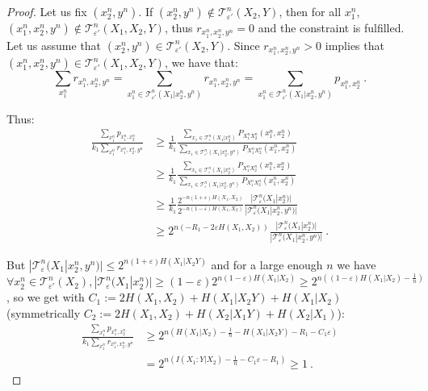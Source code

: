 \begin{proof}
    Let us fix $(x_2^n,y^n)$. If $(x_2^n,y^n) \not\in \mathcal{T}^n_{\varepsilon'}(X_2,Y)$, then for all $x_1^n$, $(x_1^n,x_2^n,y^n) \not\in \mathcal{T}^n_{\varepsilon'}(X_1,X_2,Y)$, thus $r_{x_1^n,x_2^n,y^n} = 0$ and the constraint is fulfilled. Let us assume that $(x_2^n,y^n) \in \mathcal{T}^n_{\varepsilon'}(X_2,Y)$. Since $r_{x_1^n,x_2^n,y^n} > 0$ implies that $(x_1^n,x_2^n,y^n) \in \mathcal{T}^n_{\varepsilon'}(X_1,X_2,Y)$, we have that:
    \[ \sum_{x_1^n} r_{x_1^n,x_2^n,y^n} = \sum_{x_1^n \in \mathcal{T}^n_{\varepsilon'}(X_1|x_2^n,y^n)} r_{x_1^n,x_2^n,y^n} = \sum_{x_1^n \in \mathcal{T}^n_{\varepsilon'}(X_1|x_2^n,y^n)} p_{x_1^n,x_2^n} \ .\]
    
    Thus:
     \begin{equation}
      \begin{aligned}
        \frac{\sum_{x_1^n} p_{x_1^n,x_2^n}}{k_1\sum_{x_1^n} r_{x_1^n,x_2^n,y^n}} &\geq \frac{1}{k_1} \frac{ \sum_{x_1 \in \mathcal{T}^n_{\varepsilon}(X_1|x_2^n)}P_{X_1^nX_2^n}(x_1^n,x_2^n)}{\sum_{x_1 \in \mathcal{T}^n_{\varepsilon'}(X_1|x_2^n,y^n)} P_{X_1^nX_2^n}(x_1^n,x_2^n)}\\
        &\geq \frac{1}{k_1} \frac{ \sum_{x_1 \in \mathcal{T}^n_{\varepsilon}(X_1|x_2^n)}P_{X_1^nX_2^n}(x_1^n,x_2^n)}{\sum_{x_1 \in \mathcal{T}^n_{\varepsilon}(X_1|x_2^n,y^n)} P_{X_1^nX_2^n}(x_1^n,x_2^n)}\\
        &\geq \frac{1}{k_1}\frac{2^{-n(1+\varepsilon)H(X_1,X_2)}}{2^{-n(1-\varepsilon)H(X_1,X_2)}}\frac{|\mathcal{T}^n_{\varepsilon}(X_1|x_2^n)|}{|\mathcal{T}^n_{\varepsilon}(X_1|x_2^n,y^n)|}\\
        &\geq 2^{n(-R_1-2\varepsilon H(X_1,X_2))}\frac{|\mathcal{T}^n_{\varepsilon}(X_1|x_2^n)|}{|\mathcal{T}^n_{\varepsilon}(X_1|x_2^n,y^n)|}\ .
      \end{aligned}
    \end{equation}

     But $|\mathcal{T}^n_{\varepsilon}(X_1|x_2^n,y^n)| \leq 2^{n(1+\varepsilon)H(X_1|X_2Y)}$ and for a large enough $n$ we have $\forall x_2^n \in \mathcal{T}^n_{\varepsilon'}(X_2), |\mathcal{T}^n_{\varepsilon}(X_1|x_2^n)| \geq (1-\varepsilon)2^{n(1-\varepsilon)H(X_1|X_2)} \geq 2^{n\left((1-\varepsilon)H(X_1|X_2)-\frac{1}{n}\right)}$, so we get with $C_1 := 2 H(X_1,X_2) + H(X_1|X_2Y) + H(X_1|X_2)$ (symmetrically $C_2 := 2 H(X_1,X_2) + H(X_2|X_1Y) + H(X_2|X_1)$):
     \begin{equation}
       \begin{aligned}
         \frac{\sum_{x_1^n} p_{x_1^n,x_2^n}}{k_1\sum_{x_1^n} r_{x_1^n,x_2^n,y^n}} &\geq 2^{n\left(H(X_1|X_2) - \frac{1}{n} -H(X_1|X_2Y)-R_1-C_1\varepsilon\right)}\\
         &= 2^{n\left(I(X_1: Y | X_2)-\frac{1}{n}-C_1\varepsilon-R_1\right)} \geq 1 \ .
      \end{aligned}
    \end{equation}         
     

\end{proof}
